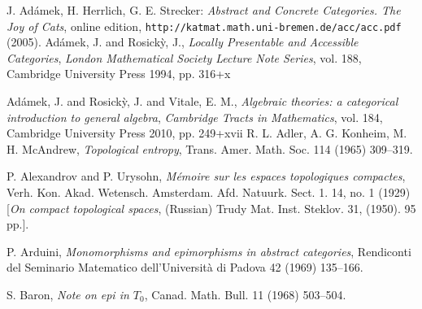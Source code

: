 \documentclass[12pt]{article}
\theoremstyle{definition}
\numberwithin{equation}{section}
\begin{document}
\begin{thebibliography}{999}
 
\footnotesize{ 

 {J. Ad\'amek, H. Herrlich, G. E. Strecker}: {\em Abstract and Concrete Categories. The Joy of Cats}, online edition, {\tt http://katmat.math.uni-bremen.de/acc/acc.pdf} (2005).
 {Ad{\'a}mek, J. and Rosick{\`y}, J.}, {\em Locally Presentable and Accessible Categories}, {\em London Mathematical Society Lecture Note Series},  vol. 188, Cambridge University Press 1994, pp. 316+x


 {Ad{\'a}mek, J. and Rosick{\`y}, J. and Vitale, E. M.}, {\em Algebraic theories: a categorical introduction to general algebra}, {\em Cambridge Tracts in Mathematics},  vol. 184, Cambridge University Press 2010, pp. 249+xvii
 {R. L. Adler, A. G. Konheim, M. H. McAndrew}, \textit{Topological entropy}, Trans. Amer. Math. Soc. 114 (1965) 309--319.

 

  P. Alexandrov and P. Urysohn, {\em M\' emoire sur les espaces topologiques compactes}, 
Verh. Kon. Akad. Wetensch. Amsterdam. Afd. Natuurk. Sect. 1. 14, no. 1 (1929) [{\em  On compact topological spaces}, (Russian) Trudy Mat. Inst. Steklov. 31, (1950). 95 pp.]. 
 
 P. Arduini, {\em Monomorphisms and epimorphisms in abstract categories}, Rendiconti del Seminario Matematico dell'Universit\`a di Padova 42 (1969) 135--166. 
 
 S. Baron, \emph{Note on epi in $T_0$}, Canad. Math. Bull. 11 (1968) 503--504.



}
\end{thebibliography}
\end{document}
